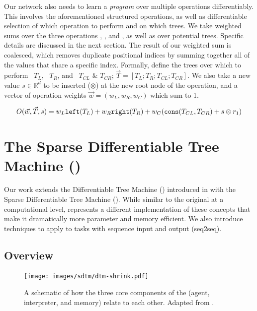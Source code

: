 Our network also needs to learn a \textit{program} over multiple operations differentiably. This involves the aforementioned structured operations, as well as differentiable selection of which operation to perform and on which trees. We take weighted sums over the three operations \leftcommand, \rightcommand, and \cons, as well as over potential trees. Specific details are discussed in the next section. The result of our weighted sum is coalesced, which removes duplicate positional indices by summing together all of the values that share a specific index. 
Formally, define the trees over which to perform \leftcommand \ $T_{L}$, \rightcommand \ $T_{R}$, and \cons \ $T_{CL}$ \& $T_{CR}$; $\vec{T}=[T_{L};T_{R};T_{CL};T_{CR}]$. We  also take a new value $s \in \mathbb{R}^{d}$ to be inserted ($\otimes$) at the new root node of the \cons operation, and a vector of operation weights $\vec{w} = (w_L,  w_R, w_C)$ which sum to 1.

\begin{equation} \label{eq:output}
O(\vec{w}, \vec{T}, s) = w_L \texttt{left}(T_{L}) + w_R \texttt{right}(T_{R}) + w_C ( \texttt{cons}(T_{CL}, T_{CR}) +  s \otimes r_{1})
\end{equation}

\section{The Sparse Differentiable Tree Machine (\sdtm)}
\label{sec:sdtm-dtm-modifications}

Our work extends the Differentiable Tree Machine (\dtm) introduced in \citet{Soulos_2023_DifferentiableTreeOperations} with the Sparse Differentiable Tree Machine (\sdtm). While similar to the original at a computational level, \sdtm represents a different implementation of these concepts that make it dramatically more parameter and memory efficient. We also introduce techniques to apply \sdtm to tasks with sequence input and output (seq2seq). 

\subsection{Overview} \label{sec:sdtm-dtm_sparse}
\begin{figure}
    \centering
    \texttt{[image: images/sdtm/dtm-shrink.pdf]}
    \caption{A schematic of how the three core components of the \dtm (agent, interpreter, and memory) relate to each other. Adapted from \citet{Soulos_2023_DifferentiableTreeOperations}.}
    \label{fig:dtm}
\end{figure}

